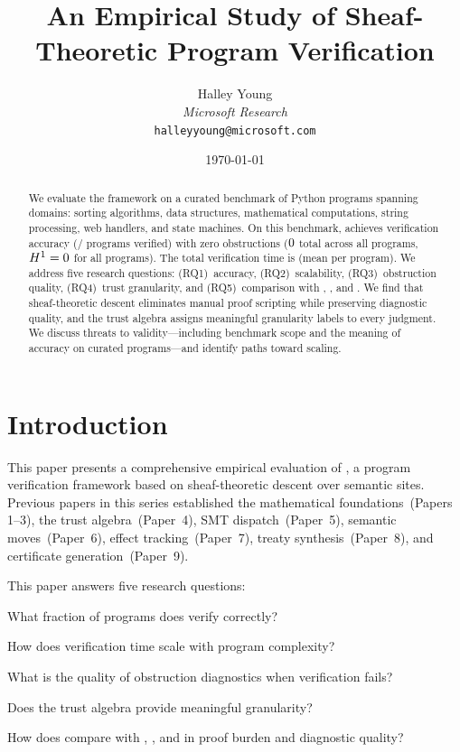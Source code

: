 \documentclass[11pt]{article}
\title{An Empirical Study of Sheaf-Theoretic Program Verification}
\author{%
  Halley Young\\
  \textit{Microsoft Research}\\
  \texttt{halleyyoung@microsoft.com}
}
\date{\today}
\begin{document}
\maketitle

\begin{abstract}
We evaluate the \JuGeo{} framework on a curated benchmark of
\expTotalPrograms{} Python programs spanning \expDomainCount{} domains:
sorting algorithms, data structures, mathematical computations, string
processing, web handlers, and state machines.  On this benchmark,
\JuGeo{} achieves \expAccuracy{} verification accuracy
(\expVerified{}/\expTotalPrograms{} programs verified) with zero
obstructions ($0{}$ total across all programs,
$H^{1} = 0$ for all \expHOneZero{} programs).  The total
verification time is \expTimeTotal{} (mean \expTimeMean{} per
program).  We address five research questions: (RQ1)~accuracy,
(RQ2)~scalability, (RQ3)~obstruction quality, (RQ4)~trust
granularity, and (RQ5)~comparison with \LEAN{}, \Fstar{}, and
\Dafny{}.  We find that sheaf-theoretic descent eliminates manual
proof scripting while preserving diagnostic quality, and the trust
algebra assigns meaningful granularity labels to every judgment.
We discuss threats to validity---including benchmark scope and the
meaning of \expAccuracy{} accuracy on curated programs---and identify
paths toward scaling.
\end{abstract}

\newpage

\section{Introduction}\label{sec:intro}

This paper presents a comprehensive empirical evaluation of
\JuGeo{}, a program verification framework based on sheaf-theoretic
descent over semantic sites.  Previous papers in this series
established the mathematical foundations~(Papers 1--3), the trust
algebra~(Paper~4), SMT dispatch~(Paper~5), semantic
moves~(Paper~6), effect tracking~(Paper~7), treaty
synthesis~(Paper~8), and certificate generation~(Paper~9).

This paper answers five research questions:

\begin{description}[nosep,leftmargin=1em]
\item[RQ1 (Accuracy)] What fraction of programs does \JuGeo{}
  verify correctly?
\item[RQ2 (Scalability)] How does verification time scale with
  program complexity?
\item[RQ3 (Obstructions)] What is the quality of obstruction
  diagnostics when verification fails?
\item[RQ4 (Trust)] Does the trust algebra provide meaningful
  granularity?
\item[RQ5 (Comparison)] How does \JuGeo{} compare with \LEAN{},
  \Fstar{}, and \Dafny{} in proof burden and diagnostic quality?
\end{description}
\end{document}
